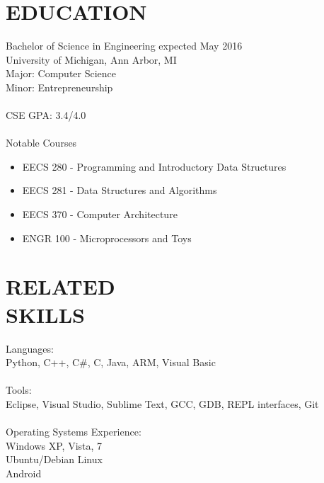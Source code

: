 \documentclass[line,margin]{res}
\begin{document}
\address{ajlj@umich.edu -- 248-622-7017}
\address{Citizen of the United States and Italy}
 
 \renewcommand{\labelitemi}{$-$}
 
\begin{resume}
\section{EDUCATION} {\sc Bachelor of Science in Engineering} \hfill expected May 2016\\
                University of Michigan, Ann Arbor, MI \\
                Major: Computer Science \\
                Minor: Entrepreneurship \\ \\
                CSE GPA: 3.4/4.0\\ \\
                {\sc Notable Courses}
                \begin{itemize}
                \item EECS 280 - Programming and Introductory Data Structures
                \item EECS 281 - Data Structures and Algorithms
                \item EECS 370 - Computer Architecture
                \item ENGR 100 - Microprocessors and Toys
                \end{itemize}
 
 
\section{RELATED \\ SKILLS} 
				{\sc Languages:} \\
				Python, C++, C\#, C, Java, ARM, Visual Basic \\ \\
                {\sc Tools:} \\
                Eclipse, Visual Studio, Sublime Text, GCC, GDB, REPL interfaces, Git\\ \\
				{\sc Operating Systems Experience:}\\
				Windows XP, Vista, 7 \\
				Ubuntu/Debian Linux \\
				Android
 

\end{resume}
\end{document}
